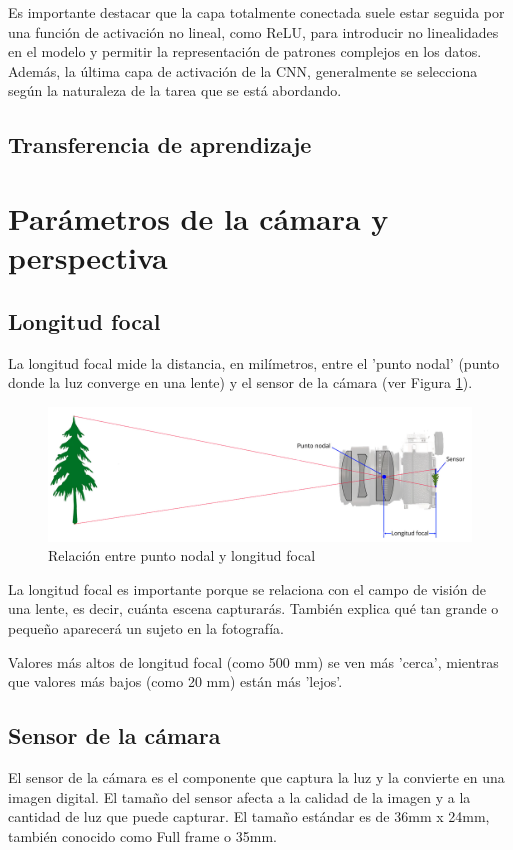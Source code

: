 Es importante destacar que la capa totalmente conectada suele estar seguida por una función de activación no lineal, como ReLU, para introducir no linealidades en el modelo y permitir la representación de patrones complejos en los datos. Además, la última capa de activación de la CNN, generalmente se selecciona según la naturaleza de la tarea que se está abordando.

\subsection{Transferencia de aprendizaje}

\section{Parámetros de la cámara y perspectiva}

\subsection*{Longitud focal}
La longitud focal \cite{44} mide la distancia, en milímetros, entre el 'punto nodal' (punto donde la luz converge en una lente) y el sensor de la cámara (ver Figura \ref{fig10}). 

\begin{figure}[h]
	\centering
	\includegraphics[scale=0.25]{imagenes/cap2/focal.png}
	\caption{Relación entre punto nodal y longitud focal \cite{44}}
	\label{fig10}
\end{figure}

La longitud focal es importante porque se relaciona con el campo de visión de una lente, es decir, cuánta escena capturarás. También explica qué tan grande o pequeño aparecerá un sujeto en la fotografía.

Valores más altos de longitud focal (como 500 mm) se ven más 'cerca', mientras que valores más bajos (como 20 mm) están más 'lejos'.

\subsection*{Sensor de la cámara}
El sensor de la cámara \cite{45,47} es el componente que captura la luz y la convierte en una imagen digital. El tamaño del sensor afecta a la calidad de la imagen y a la cantidad de luz que puede capturar. El tamaño estándar es de 36mm x 24mm, también conocido como Full frame o 35mm.

